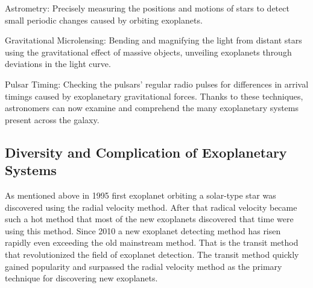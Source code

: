 \documentclass{article}
\begin{document}
Astrometry: Precisely measuring the positions and motions of stars to detect small periodic changes caused by orbiting exoplanets.

Gravitational Microlensing: Bending and magnifying the light from distant stars using the gravitational effect of massive objects, unveiling exoplanets through deviations in the light curve.

Pulsar Timing: Checking the pulsars' regular radio pulses for differences in arrival timings caused by exoplanetary gravitational forces.
Thanks to these techniques, astronomers can now examine and comprehend the many exoplanetary systems present across the galaxy.

\subsection{Diversity and Complication of Exoplanetary Systems}

As mentioned above in 1995 first exoplanet orbiting a solar-type star was discovered using the radial velocity method. After that radical velocity became such a hot method that most of the new exoplanets discovered that time were using this method. Since 2010 a new exoplanet detecting method has risen rapidly even exceeding the old mainstream method. That is the transit method that revolutionized the field of exoplanet detection. The transit method quickly gained popularity and surpassed the radial velocity method as the primary technique for discovering new exoplanets.
\end{document}
